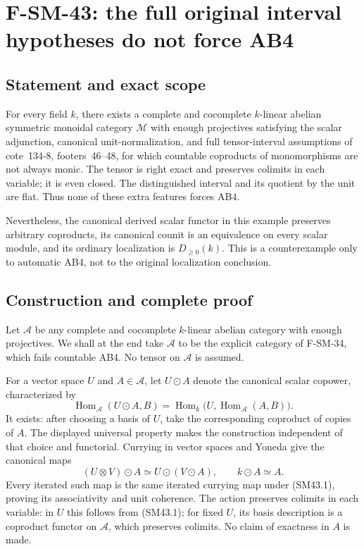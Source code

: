 \section{F-SM-43: the full original interval hypotheses do not force AB4}

\subsection{Statement and exact scope}
For every field \(k\), there exists a complete and cocomplete
\(k\)-linear abelian symmetric monoidal category \(\mathcal M\)
with enough projectives satisfying the scalar adjunction,
canonical unit-normalization, and full tensor-interval assumptions
of cote~134-8, footers~46--48, for which countable coproducts of
monomorphisms are not always monic.  The tensor is right exact
and preserves colimits in each variable; it is even closed.
The distinguished interval and its quotient by the unit are flat.
Thus none of these extra features forces AB4.

Nevertheless, the canonical derived scalar functor in this example
preserves arbitrary coproducts, its canonical counit is an
equivalence on every scalar module, and its ordinary localization
is \(D_{\ge0}(k)\).  This is a counterexample only to automatic
AB4, not to the original localization conclusion.

\subsection{Construction and complete proof}
Let \(\mathcal A\) be any complete and cocomplete \(k\)-linear
abelian category with enough projectives.  We shall at the end
take \(\mathcal A\) to be the explicit category of F-SM-34,
which fails countable AB4.  No tensor on \(\mathcal A\) is assumed.

For a vector space \(U\) and \(A\in\mathcal A\), let
\(U\odot A\) denote the canonical scalar copower, characterized by
\[
 \operatorname{Hom}_{\mathcal A}(U\odot A,B)
  =\operatorname{Hom}_k\bigl(U,
               \operatorname{Hom}_{\mathcal A}(A,B)\bigr).
                                                               \tag{SM43.1}
\]
It exists: after choosing a basis of \(U\), take the corresponding
coproduct of copies of \(A\).  The displayed universal property
makes the construction independent of that choice and functorial.
Currying in vector spaces and Yoneda give the canonical maps
\[
 (U\otimes V)\odot A\simeq U\odot(V\odot A),
       \qquad k\odot A\simeq A.                              \tag{SM43.2}
\]
Every iterated such map is the same iterated currying map under
(SM43.1), proving its associativity and unit coherence.
The action preserves colimits in each variable: in \(U\) this
follows from (SM43.1); for fixed \(U\), its basis description is
a coproduct functor on \(\mathcal A\), which preserves colimits.
No claim of exactness in \(A\) is made.

